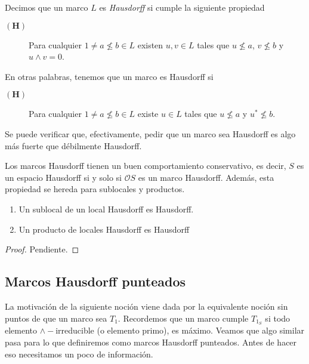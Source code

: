 \begin{dfn}\label{MarcoHausdorff}
    Decimos que un marco $L$ es \emph{Hausdorff} si cumple la siguiente propiedad
    \begin{description}
        \item[$\mathbf{(H)}$] Para cualquier $1\neq a\nleq b\in L$ existen $u, v\in L$ tales que $u\nleq a$, $v\nleq b$ y $u\wedge v=0$. 
    \end{description}
\end{dfn}
En otras palabras, tenemos que un marco es Hausdorff si
\begin{description}
    \item[$\mathbf{(H)}$]  Para cualquier $1\neq a\nleq b\in L$ existe $u\in L$ tales que $u\nleq a$ y $u^*\nleq b$. 
\end{description}

Se puede verificar que, efectivamente, pedir que un marco sea Hausdorff es algo más fuerte que débilmente Hausdorff.\\

\begin{obs}\label{Observacion3.4.1}
Los marcos Hausdorff tienen un buen comportamiento conservativo, es decir, $S$ es un espacio Hausdorff si y solo si $\mathcal{O}S$ es un marco Hausdorff. Además, esta propiedad se hereda para sublocales y productos.
\end{obs}

\begin{prop}\label{Heredar H}
    \begin{enumerate}
        \item Un sublocal de un local Hausdorff es Hausdorff.
        \item Un producto de locales Hausdorff es Hausdorff
    \end{enumerate}
\end{prop}

\begin{proof}
    Pendiente.
\end{proof}

\subsection{Marcos Hausdorff punteados}

La motivación de la siguiente noción viene dada por la equivalente noción sin puntos de que un marco sea $T_1$. Recordemos que un marco cumple $T_{1_S}$ si todo elemento $\wedge-$irreducible (o elemento primo), es máximo. Veamos que algo similar pasa para lo que definiremos como marcos Hausdorff punteados. Antes de hacer eso necesitamos un poco de información.


